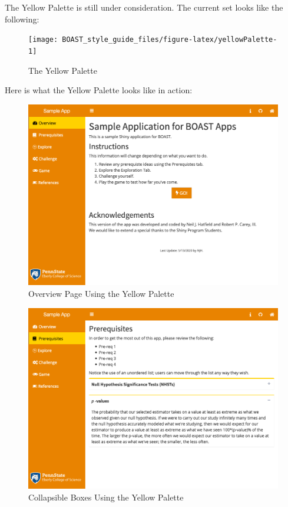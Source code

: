 \documentclass[
]{book}
\begin{document}
The Yellow Palette is still under consideration. The current set looks like the following:

\begin{figure}

{\centering \texttt{[image: BOAST\_style\_guide\_files/figure-latex/yellowPalette-1]} 

}

\caption{The Yellow Palette}\label{fig:yellowPalette}
\end{figure}

Here is what the Yellow Palette looks like in action:

\begin{figure}

{\centering \includegraphics[width=14in]{images/yellowOverview} 

}

\caption{Overview Page Using the Yellow Palette}\label{fig:yellowAction1}
\end{figure}

\begin{figure}

{\centering \includegraphics[width=14in]{images/yellowCollapse} 

}

\caption{Collapsible Boxes Using the Yellow Palette}\label{fig:yellowAction2}
\end{figure}
\end{document}

